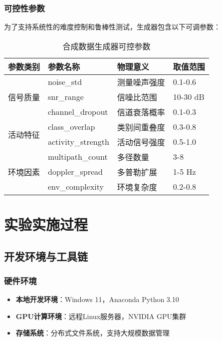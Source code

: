 \subsubsection{可控性参数}
为了支持系统性的难度控制和鲁棒性测试，生成器包含以下可调参数：

\begin{table}[h]
\centering
\caption{合成数据生成器可控参数}
\label{tab:controllable_parameters}
\begin{tabular}{@{}llll@{}}
\toprule
参数类别 & 参数名称 & 物理意义 & 取值范围 \\
\midrule
\multirow{3}{*}{信号质量} & noise\_std & 测量噪声强度 & 0.1-0.6 \\
& snr\_range & 信噪比范围 & 10-30 dB \\
& channel\_dropout & 信道衰落概率 & 0.1-0.3 \\
\midrule
\multirow{2}{*}{活动特征} & class\_overlap & 类别间重叠度 & 0.3-0.8 \\
& activity\_strength & 活动信号强度 & 0.5-1.0 \\
\midrule
\multirow{3}{*}{环境因素} & multipath\_count & 多径数量 & 3-8 \\
& doppler\_spread & 多普勒扩展 & 1-5 Hz \\
& env\_complexity & 环境复杂度 & 0.2-0.8 \\
\bottomrule
\end{tabular}
\end{table}

\section{实验实施过程}
\label{sec:implementation}

\subsection{开发环境与工具链}
\label{subsec:development_environment}

\subsubsection{硬件环境}
\begin{itemize}
\item \textbf{本地开发环境}：Windows 11，Anaconda Python 3.10
\item \textbf{GPU计算环境}：远程Linux服务器，NVIDIA GPU集群
\item \textbf{存储系统}：分布式文件系统，支持大规模数据管理
\end{itemize}

